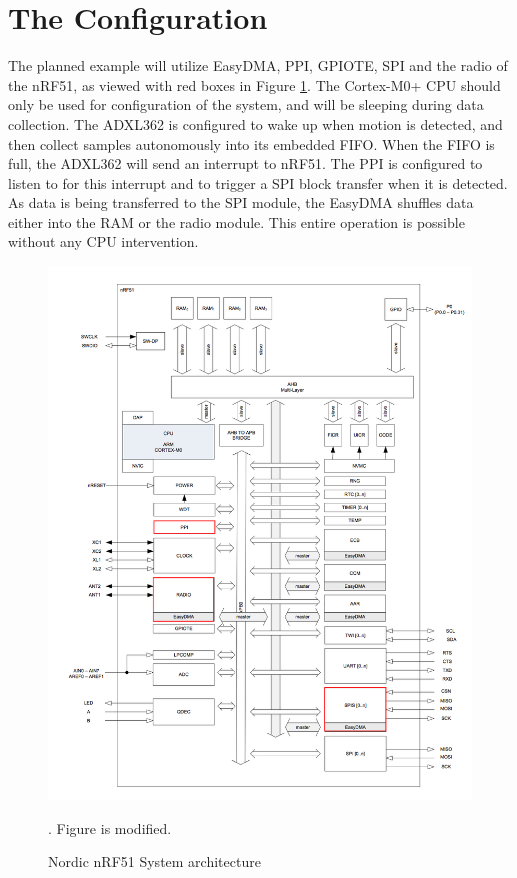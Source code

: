 \section{The Configuration}

The planned example will utilize EasyDMA, PPI, GPIOTE, SPI and the radio of the nRF51, as viewed with red boxes in Figure \ref{fig:accel_working_principle}. The Cortex-M0+ CPU should only be used for configuration of the system, and will be sleeping during data collection. The ADXL362 is configured to wake up when motion is detected, and then collect samples autonomously into its embedded FIFO. When the FIFO is full, the ADXL362 will send an interrupt to nRF51. The PPI is configured to listen to for this interrupt and to trigger a SPI block transfer when it is detected. As data is being transferred to the SPI module, the EasyDMA shuffles data either into the RAM or the radio module. This entire operation is possible without any CPU intervention.

\begin{figure}[h]
\centering
\includegraphics[scale=0.5]{fig/nrf51822_edit.png}
\caption{Nordic nRF51 System architecture \cite{nRF51}}. Figure is modified.
\label{fig:accel_working_principle}
\end{figure}

